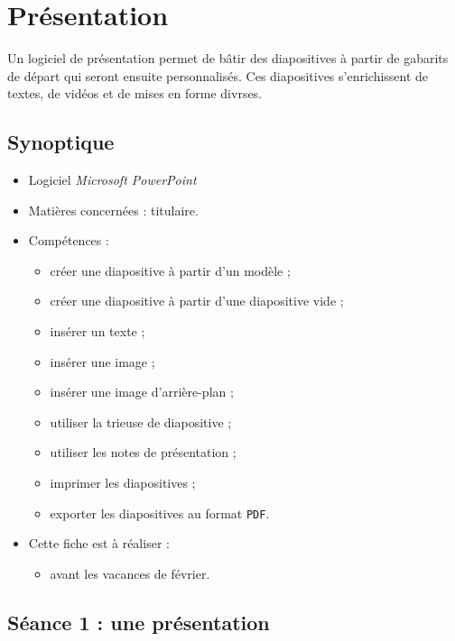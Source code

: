 \chapter{Présentation}  

Un logiciel de présentation permet de bâtir des diapositives à partir de gabarits de départ qui seront ensuite personnalisés. Ces diapositives s'enrichissent de textes, de vidéos et de mises en forme divrses.

\section*{Synoptique}

{\footnotesize
\begin{itemize}
\item Logiciel \emph{Microsoft PowerPoint} 
\item Matières concernées : titulaire.
\item Compétences : 
        \begin{itemize}
        \item créer une diapositive à partir d'un modèle ; 
	\item créer une diapositive à partir d'une diapositive vide ;
	\item insérer un texte ;
	\item insérer une image ;
	\item insérer une image d'arrière-plan ;
	\item utiliser la trieuse de diapositive ;
	\item utiliser les notes de présentation ;
	\item imprimer les diapositives ;
	\item exporter les diapositives au format \texttt{PDF}.
        \end{itemize}
\item Cette fiche est à réaliser :
        \begin{itemize}
        \item avant les vacances de février. 
        \end{itemize}
\end{itemize}
}%


\vfill
\phantom{rien}

%
%
%
%

\pagebreak

\section{Séance 1 : une présentation}\label{fichePresentation6e1}

